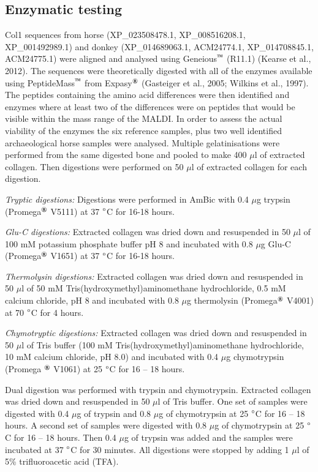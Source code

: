 \documentclass[preprint, 3p, authoryear]{elsarticle} %
\begin{document}
\hypertarget{enzymatic-testing}{%
\subsection{Enzymatic testing}\label{enzymatic-testing}}

Col1 sequences from horse (XP\_023508478.1, XP\_008516208.1, XP\_001492989.1) and donkey (XP\_014689063.1, ACM24774.1, XP\_014708845.1, ACM24775.1) were aligned and analysed using Geneious\(^\text{\texttrademark}\) (R11.1) (Kearse et al., 2012). The sequences were theoretically digested with all of the enzymes available using PeptideMass\(^\text{\texttrademark}\) from Expasy\(^\text{\textregistered}\) (Gasteiger et al., 2005; Wilkins et al., 1997). The peptides containing the amino acid differences were then identified and enzymes where at least two of the differences were on peptides that would be visible within the mass range of the MALDI. In order to assess the actual viability of the enzymes the six reference samples, plus two well identified archaeological horse samples were analysed. Multiple gelatinisations were performed from the same digested bone and pooled to make 400 \(\mu\)l of extracted collagen. Then digestions were performed on 50 \(\mu\)l of extracted collagen for each digestion.

\emph{Tryptic digestions:} Digestions were performed in AmBic with 0.4 \(\mu\)g trypsin (Promega\(^\text{\textregistered}\) V5111) at 37 \(\text{\textdegree}\)C for 16-18 hours.

\emph{Glu-C digestions:} Extracted collagen was dried down and resuspended in 50 \(\mu\)l of 100 mM potassium phosphate buffer pH 8 and incubated with 0.8 \(\mu\)g Glu-C (Promega\(^\text{\textregistered}\) V1651) at 37 \(\text{\textdegree}\)C for 16-18 hours.

\emph{Thermolysin digestions:} Extracted collagen was dried down and resuspended in 50 \(\mu\)l of 50 mM Tris(hydroxymethyl)aminomethane hydrochloride, 0.5 mM calcium chloride, pH 8 and incubated with 0.8 \(\mu\)g thermolysin (Promega\(^\text{\textregistered}\) V4001) at 70 \(\text{\textdegree}\)C for 4 hours.

\emph{Chymotryptic digestions:} Extracted collagen was dried down and resuspended in 50 \(\mu\)l of Tris buffer (100 mM Tris(hydroxymethyl)aminomethane hydrochloride, 10 mM calcium chloride, pH 8.0) and incubated with 0.4 \(\mu\)g chymotrypsin (Promega \(^\text{\textregistered}\) V1061) at 25 \(\text{\textdegree}\)C for 16 -- 18 hours.

Dual digestion was performed with trypsin and chymotrypsin. Extracted collagen was dried down and resuspended in 50 \(\mu\)l of Tris buffer. One set of samples were digested with 0.4 \(\mu\)g of trypsin and 0.8 \(\mu\)g of chymotrypsin at 25 \(\text{\textdegree}\)C for 16 -- 18 hours. A second set of samples were digested with 0.8 \(\mu\)g of chymotrypsin at 25 \(\text{\textdegree}\)C for 16 -- 18 hours. Then 0.4 \(\mu\)g of trypsin was added and the samples were incubated at 37 \(\text{\textdegree}\)C for 30 minutes. All digestions were stopped by adding 1 \(\mu\)l of 5\% trifluoroacetic acid (TFA).
\end{document}
